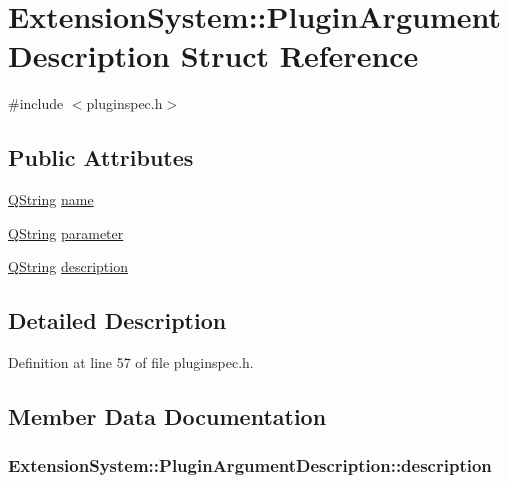 \hypertarget{struct_extension_system_1_1_plugin_argument_description}{\section{\-Extension\-System\-:\-:\-Plugin\-Argument\-Description \-Struct \-Reference}
\label{struct_extension_system_1_1_plugin_argument_description}
}


{\ttfamily \#include $<$pluginspec.\-h$>$}

\subsection*{\-Public \-Attributes}
\begin{DoxyCompactItemize}
\item 
\hyperlink{group___u_a_v_objects_plugin_gab9d252f49c333c94a72f97ce3105a32d}{\-Q\-String} \hyperlink{struct_extension_system_1_1_plugin_argument_description_a495886e47df85811638066b4263f27a1}{name}
\item 
\hyperlink{group___u_a_v_objects_plugin_gab9d252f49c333c94a72f97ce3105a32d}{\-Q\-String} \hyperlink{struct_extension_system_1_1_plugin_argument_description_a451dd714bb63d9c2125491f142939b01}{parameter}
\item 
\hyperlink{group___u_a_v_objects_plugin_gab9d252f49c333c94a72f97ce3105a32d}{\-Q\-String} \hyperlink{struct_extension_system_1_1_plugin_argument_description_a8d39b6ae0e813cff56a3b2c7c9393e5c}{description}
\end{DoxyCompactItemize}


\subsection{\-Detailed \-Description}


\-Definition at line 57 of file pluginspec.\-h.



\subsection{\-Member \-Data \-Documentation}
\hypertarget{struct_extension_system_1_1_plugin_argument_description_a8d39b6ae0e813cff56a3b2c7c9393e5c}{
\subsubsection[{description}]{ {\bf \-Extension\-System\-::\-Plugin\-Argument\-Description\-::description}}}\label{struct_extension_system_1_1_plugin_argument_description_a8d39b6ae0e813cff56a3b2c7c9393e5c}



